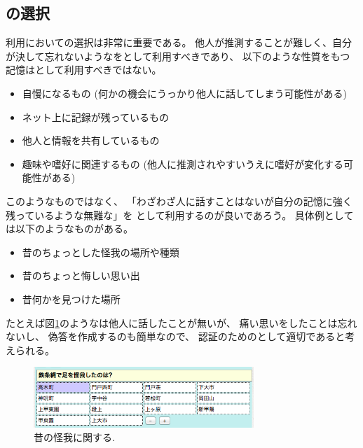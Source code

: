 \documentclass[twoside]{wiss}
\begin{document}
\subsection{{\SQ}の選択}
\label{goodquestions}

{\EP}利用において{\SQ}の選択は非常に重要である。
他人が推測することが難しく、自分が決して忘れないような{\EM}を{\SQ}として利用すべきであり、
以下のような性質をもつ記憶は{\SQ}として利用すべきではない。

\begin{itemize}
\item \textsf{自慢になるもの
(何かの機会にうっかり他人に話してしまう可能性がある)}

\vspace{-1mm}
\item \textsf{ネット上に記録が残っているもの}

\vspace{-1mm}
\item \textsf{他人と情報を共有しているもの}

\vspace{-1mm}
\item \textsf{趣味や嗜好に関連するもの
(他人に推測されやすいうえに嗜好が変化する可能性がある)}

\end{itemize}

\noindent
このようなものではなく、
「わざわざ人に話すことはないが自分の記憶に強く残っているような無難な{\EM}」を
{\SQ}として利用するのが良いであろう。
具体例としては以下のようなものがある。

\begin{itemize}
\item 昔のちょっとした怪我の場所や種類

\vspace{-1mm}
\item 昔のちょっと悔しい思い出

\vspace{-1mm}
\item 昔何かを見つけた場所
\end{itemize}

たとえば図\ref{kega}のような{\SQ}は他人に話したことが無いが、
痛い思いをしたことは忘れないし、
偽答を作成するのも簡単なので、
認証のための{\SQ}として適切であると考えられる。

\begin{figure}[H]
\centerline{\includegraphics[width=83mm,bb=0 0 502 138]{figures/5c50eed4646232e070646f87b2c8565c.png}}
\caption{昔の怪我に関する{\SQ}.}
\label{kega}
\end{figure}
\end{document}

